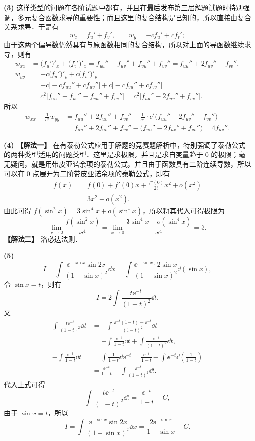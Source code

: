 \begin{solution}
  \textbf{(3)} 这样类型的问题在各阶试题中都有，并且在最后发布第三届解题试题时特别强调，多元复合函数求导的重要性；而且这里的复合结构是已知的，所以直接由复合关系求导．于是有
  \[
    w_x=f_u'+f_v',\qquad w_y=-cf_u'+cf_v';
  \]
  由于这两个偏导数仍然具有与原函数相同的复合结构，所以对上面的导函数继续求导，则有
  \begin{align*}
    w_{xx}&=\bigl(f_u'\bigr)'_x+\bigl(f_v'\bigr)'_x
    =f_{uu}''+f_{uv}''+f_{vu}''+f_{vv}''=f_{uu}''+2f_{uv}''+f_{vv}'',\\
    w_{yy}&=-c\bigl(f_u'\bigr)'_y+c\bigl(f_v'\bigr)'_y\\
    &=-c\bigl[-cf_{uu}''+cf_{uv}''\bigr]+c\bigl[-cf_{vu}''+cf_{vv}''\bigr]\\
    &=c^2\bigl[f_{uu}''-f_{uv}''-f_{vu}''+f_{vv}''\bigr]
    =c^2\bigl[f_{uu}''-2f_{uv}''+f_{vv}''\bigr].
  \end{align*}
  所以
  \begin{align*}
    w_{xx}-\frac{1}{c^2}w_{yy}
    &=f_{uu}''+2f_{uv}''+f_{vv}''-\frac{1}{c^2}\cdot c^2
      \bigl(f_{uu}''-2f_{uv}''+f_{vv}''\bigr)\\
    &=f_{uu}''+2f_{uv}''+f_{vv}''-\bigl(f_{uu}''-2f_{uv}''+f_{vv}''\bigr)
    =4f_{uv}''.
  \end{align*}

  \textbf{(4)} \textbf{【解法一】} 在有泰勒公式应用于解题的竞赛题解析中，特别强调了泰勒公式的两种类型适用的问题类型．这里是求极限，并且是求自变量趋于 $0$ 的极限；毫无疑问，就是用带皮亚诺余项的泰勒公式，并且由于函数具有二阶连续导数，所以可以在 $0$ 点展开为二阶带皮亚诺余项的泰勒公式，即有
  \begin{align*}
    f(x)&=f(0)+f'(0)x+\frac{f''(0)}{2!}x^2+o(x^2)\\
    &=3x^2+o(x^2).
  \end{align*}
  由此可得 $f(\sin^2 x)=3\sin^4 x+o(\sin^4 x)$，所以将其代入可得极限为
  \[
    \lim_{x\to 0}\frac{f(\sin^2 x)}{x^4}
    =\lim_{x\to 0}\frac{3\sin^4 x+o(\sin^4 x)}{x^4}=3.
  \]
  \textbf{【解法二】} 洛必达法则．

  \textbf{(5)}
  \[
    I=\int\frac{\ee^{-\sin x}\sin 2x}{(1-\sin x)^2}\dd x
    =\int\frac{\ee^{-\sin x}\cdot 2\sin x}{(1-\sin x)^2}\dd(\sin x),
  \]
  令 $\sin x=t$，则有
  \[
    I=2\int\frac{t\ee^{-t}}{(1-t)^2}\dd t.
  \]
  又
  \begin{align*}
    \int\frac{t\ee^{-t}}{(1-t)^2}\dd t
    &=-\int\frac{\ee^{-t}(1-t)-\ee^{-t}}{(1-t)^2}\dd t\\
    &=-\int\frac{\ee^{-t}}{1-t}\dd t+\int\frac{\ee^{-t}}{(1-t)^2}\dd t,\\
    -\int\frac{\ee^{-t}}{1-t}\dd t
    &=\int\frac{1}{1-t}\dd\ee^{-t}
    =\frac{\ee^{-t}}{1-t}-\int\ee^{-t}\dd\left(\frac{1}{1-t}\right)\\
    &=\frac{\ee^{-t}}{1-t}-\int\frac{\ee^{-t}}{(1-t)^2}\dd t.
  \end{align*}
  代入上式可得
  \[
    \int\frac{t\ee^{-t}}{(1-t)^2}\dd t=\frac{\ee^{-t}}{1-t}+C,
  \]
  由于 $\sin x=t$，所以
  \[
    I=\int\frac{\ee^{-\sin x}\sin 2x}{(1-\sin x)^2}\dd x
    =\frac{2\ee^{-\sin x}}{1-\sin x}+C.
  \]


\end{solution}
